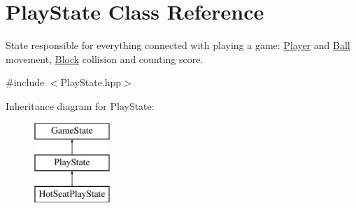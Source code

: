 \hypertarget{class_play_state}{}\section{Play\+State Class Reference}
\label{class_play_state}


State responsible for everything connected with playing a game\+: \mbox{\hyperlink{class_player}{Player}} and \mbox{\hyperlink{class_ball}{Ball}} movement, \mbox{\hyperlink{class_block}{Block}} collision and counting score.  




{\ttfamily \#include $<$Play\+State.\+hpp$>$}

Inheritance diagram for Play\+State\+:\begin{figure}[H]
\begin{center}
\leavevmode
\includegraphics[height=3.000000cm]{class_play_state}
\end{center}
\end{figure}
